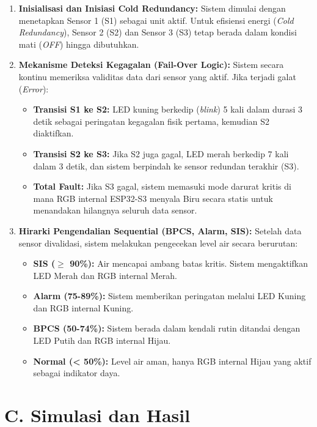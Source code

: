 \documentclass[12pt,a4paper]{article}
\begin{document}
\begin{enumerate}
    \item \textbf{Inisialisasi dan Inisiasi Cold Redundancy:} Sistem dimulai dengan menetapkan Sensor 1 (S1) sebagai unit aktif. Untuk efisiensi energi (\textit{Cold Redundancy}), Sensor 2 (S2) dan Sensor 3 (S3) tetap berada dalam kondisi mati (\textit{OFF}) hingga dibutuhkan.
    
    \item \textbf{Mekanisme Deteksi Kegagalan (Fail-Over Logic):} Sistem secara kontinu memeriksa validitas data dari sensor yang aktif. Jika terjadi galat (\textit{Error}):
    \begin{itemize}
        \item \textbf{Transisi S1 ke S2:} LED kuning berkedip (\textit{blink}) 5 kali dalam durasi 3 detik sebagai peringatan kegagalan fisik pertama, kemudian S2 diaktifkan.
        \item \textbf{Transisi S2 ke S3:} Jika S2 juga gagal, LED merah berkedip 7 kali dalam 3 detik, dan sistem berpindah ke sensor redundan terakhir (S3).
        \item \textbf{Total Fault:} Jika S3 gagal, sistem memasuki mode darurat kritis di mana RGB internal ESP32-S3 menyala Biru secara statis untuk menandakan hilangnya seluruh data sensor.
    \end{itemize}

    \item \textbf{Hirarki Pengendalian Sequential (BPCS, Alarm, SIS):} Setelah data sensor divalidasi, sistem melakukan pengecekan level air secara berurutan:
    \begin{itemize}
        \item \textbf{SIS ($\geq$ 90\%):} Air mencapai ambang batas kritis. Sistem mengaktifkan LED Merah dan RGB internal Merah.
        \item \textbf{Alarm (75-89\%):} Sistem memberikan peringatan melalui LED Kuning dan RGB internal Kuning.
        \item \textbf{BPCS (50-74\%):} Sistem berada dalam kendali rutin ditandai dengan LED Putih dan RGB internal Hijau.
        \item \textbf{Normal (< 50\%):} Level air aman, hanya RGB internal Hijau yang aktif sebagai indikator daya.
    \end{itemize}
\end{enumerate}

\newpage
\section*{C. Simulasi dan Hasil}
\end{document}
